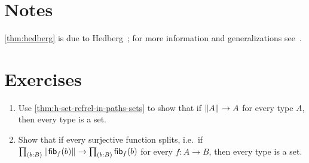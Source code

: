 \section*{Notes}

\autoref{thm:hedberg} is due to Hedberg~\cite{hedberg1998coherence}; for more information and generalizations see~\cite{krausgeneralizations}.

\section*{Exercises}

\begin{ex}
  \begin{enumerate}
    \item Use \autoref{thm:h-set-refrel-in-paths-sets} to show 
    that if $\Vert A\Vert_{}\to A$ for every type $A$, 
    then every type is a set.
    \item Show that if every surjective function splits, 
    i.e.~if $\prd{b:B}\brck{\hfib{f}{b}}\to\prd{b:B}\hfib{f}{b}$
    for every $f:A\to B$, then every type is a set.
  \end{enumerate}
\end{ex}

\egroup

